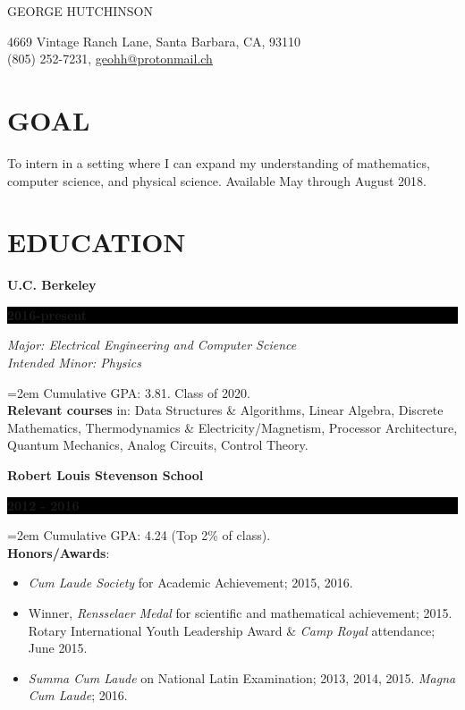 \documentclass[paper=a4,fontsize=11pt]{scrartcl} %
\newlength{\spacebox}
\newcommand{\sepspace}{\vspace*{0.5em}}		%
\newcommand{\MyName}[1]{ %
		\Huge \usefont{OT1}{phv}{b}{n} \hfill #1
		\par \normalsize \normalfont}
\newcommand{\MyContact}[1]{ %
		\large \usefont{OT1}{phv}{m}{n}\hfill #1
		\par \normalsize \normalfont}
\newcommand{\NewPart}[1]{\section*{\uppercase{#1}}}
\newcommand{\PersonalEntry}[2]{
		\noindent\hangindent=2em\hangafter=0 %
		\parbox{\spacebox}{        %
		\textit{#1}}		       %
		\hspace{1.5em} #2 \par}    %
\newcommand{\EducationEntry}[4]{
		\noindent \textbf{#1} \hfill      %
		\colorbox{Black}{%
			\parbox{6.5em}{%
			\hfill\color{White}\textbf{#2}}} \par  %
		\noindent \textit{#3} \par        %
		\noindent\hangindent=2em\hangafter=0 \small #4 %
		\normalsize \par}
\newcommand{\EducationEntryNoSubtitle}[3]{
	\noindent \textbf{#1} \hfill      %
	\colorbox{Black}{%
		\parbox{6em}{%
			\hfill\color{White}\textbf{#2}}} \par %
	\noindent\hangindent=2em\hangafter=0 \small #3 %
	\normalsize \par}
\begin{document}

\MyName{GEORGE HUTCHINSON}
\MyContact{4669 Vintage Ranch Lane, Santa Barbara, CA, 93110\\\hspace*{\fill}(805) 252-7231, \url{geohh@protonmail.ch}}
\vspace*{-2em}

%

\label{GOAL}
\NewPart{Goal}

To intern in a setting where I can expand my understanding of mathematics, computer science, and physical science.
Available May through August 2018.


\label{EDU}
\NewPart{Education}{}

\EducationEntry{U.C. Berkeley}{2016-present}{Major: Electrical Engineering and Computer Science\\Intended Minor: Physics}{Cumulative GPA: 3.81. Class of 2020.\\\textbf{Relevant courses} in: Data Structures \& Algorithms, Linear Algebra, Discrete Mathematics, Thermodynamics \& Electricity/Magnetism, Processor Architecture, Quantum Mechanics, Analog Circuits, Control Theory.}
\sepspace

\EducationEntryNoSubtitle{Robert Louis Stevenson School}{2012 - 2016}{Cumulative GPA: 4.24 (Top 2\% of class).\\\textbf{Honors/Awards}:\begin{itemize}\setlength\itemsep{0em}
		\item\textit{Cum Laude Society} for Academic Achievement; 2015, 2016.
		\item Winner, \textit{Rensselaer Medal} for scientific and mathematical achievement; 2015.
		\indent Rotary International Youth Leadership Award \& \textit{Camp Royal} attendance; June 2015.
		\item \textit{Summa Cum Laude} on National Latin Examination; 2013, 2014, 2015. \textit{Magna Cum Laude}; 2016.\end{itemize}
}
\end{document}
